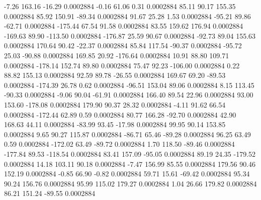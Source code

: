        -7.26      163.16      -16.29     0.0002884
       -0.16       61.06        0.31     0.0002884
       85.11       90.17      155.35     0.0002884
       85.92      150.91      -89.34     0.0002884
       91.67       25.28        1.53     0.0002884
      -95.21       89.86      -62.71     0.0002884
     -175.44       67.54       91.58     0.0002884
       83.55      159.62      176.94     0.0002884
     -169.63       89.90     -113.50     0.0002884
     -176.87       25.59       90.67     0.0002884
      -92.73       89.04      155.63     0.0002884
      170.64       90.42      -22.37     0.0002884
       85.84      117.54      -90.37     0.0002884
      -95.72       25.03      -90.88     0.0002884
      169.85       20.92     -176.64     0.0002884
       10.91       88.80      109.71     0.0002884
     -178.14      152.74       89.80     0.0002884
       75.47       92.23     -106.00     0.0002884
        0.22       88.82      155.13     0.0002884
       92.59       89.78      -26.55     0.0002884
      169.67       69.20      -89.53     0.0002884
     -174.39       26.78        0.62     0.0002884
      -96.51      153.04       89.06     0.0002884
        8.15      113.45      -90.33     0.0002884
       -9.06       90.04      -61.91     0.0002884
      166.40       89.54       22.96     0.0002884
       93.00      153.60     -178.08     0.0002884
      179.90       90.37       28.32     0.0002884
       -4.11       91.62       66.54     0.0002884
     -172.44       62.89        0.59     0.0002884
       80.77      166.28      -92.70     0.0002884
       42.90      168.63       44.11     0.0002884
      -83.99       93.45      -17.98     0.0002884
       99.95       90.14      153.85     0.0002884
        9.65       90.27      115.87     0.0002884
      -86.71       65.46      -89.28     0.0002884
       96.25       63.49        0.59     0.0002884
     -172.02       63.49      -89.72     0.0002884
        1.70      118.50      -89.46     0.0002884
     -177.84       89.53     -118.54     0.0002884
       83.41      157.09      -95.05     0.0002884
       89.19       24.35     -179.52     0.0002884
       14.18      103.11       90.18     0.0002884
       -7.47      156.99       85.55     0.0002884
      179.56       90.46      152.19     0.0002884
       -0.85       66.90       -0.82     0.0002884
       59.71       15.61      -69.42     0.0002884
       95.34       90.24      156.76     0.0002884
       95.99      115.02      179.27     0.0002884
        1.04       26.66      179.82     0.0002884
       86.21      151.24      -89.55     0.0002884
